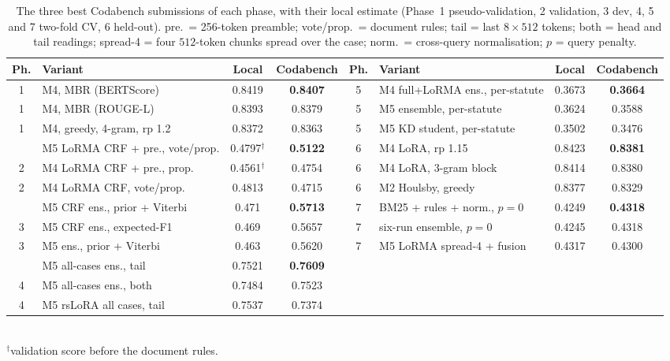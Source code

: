 \documentclass[11pt, oneside]{article}
\newcommand{\best}[1]{\textbf{#1}}
\begin{document}
\begin{table}[htbp]
\centering\scriptsize
\caption{The three best Codabench submissions of each phase, with their local estimate (Phase~1 pseudo-validation,
2 validation, 3 dev, 4, 5 and 7 two-fold CV, 6 held-out). pre.\ = 256-token preamble; vote/prop.\ = document
rules; tail = last $8\times512$ tokens; both = head and tail readings; spread-4 = four $512$-token chunks spread over the
case; norm.\ = cross-query normalisation; $p$ = query penalty.}
\label{tab:top3}
\setlength{\tabcolsep}{3pt}
\begin{tabular}{@{}cl cc @{\hspace{10pt}} cl cc@{}}
\toprule
Ph. & Variant & Local & Codabench & Ph. & Variant & Local & Codabench\\
\midrule
1 & M4, MBR (BERTScore) & 0.8419 & \best{0.8407} & 5 & M4 full+LoRMA ens., per-statute & 0.3673 & \best{0.3664}\\
1 & M4, MBR (ROUGE-L) & 0.8393 & 0.8379 & 5 & M5 ensemble, per-statute & 0.3624 & 0.3588\\
1 & M4, greedy, 4-gram, rp 1.2 & 0.8372 & 0.8363 & 5 & M5 KD student, per-statute & 0.3502 & 0.3476\\
\addlinespace
2 & M5 LoRMA CRF + pre., vote/prop. & 0.4797$^\dagger$ & \best{0.5122} & 6 & M4 LoRA, rp 1.15 & 0.8423 & \best{0.8381}\\
2 & M4 LoRMA CRF + pre., prop. & 0.4561$^\dagger$ & 0.4754 & 6 & M4 LoRA, 3-gram block & 0.8414 & 0.8380\\
2 & M4 LoRMA CRF, vote/prop. & 0.4813 & 0.4715 & 6 & M2 Houlsby, greedy & 0.8377 & 0.8329\\
\addlinespace
3 & M5 CRF ens., prior + Viterbi & 0.471 & \best{0.5713} & 7 & BM25 + rules + norm., $p{=}0$ & 0.4249 & \best{0.4318}\\
3 & M5 CRF ens., expected-F1 & 0.469 & 0.5657 & 7 & six-run ensemble, $p{=}0$ & 0.4245 & 0.4318\\
3 & M5 ens., prior + Viterbi & 0.463 & 0.5620 & 7 & M5 LoRMA spread-4 + fusion & 0.4317 & 0.4300\\
\addlinespace
4 & M5 all-cases ens., tail & 0.7521 & \best{0.7609} & & & & \\
4 & M5 all-cases ens., both & 0.7484 & 0.7523 & & & & \\
4 & M5 rsLoRA all cases, tail & 0.7537 & 0.7374 & & & & \\
\bottomrule
\end{tabular}
\\[2pt]{\footnotesize $^\dagger$validation score before the document rules.}
\end{table}
\end{document}
